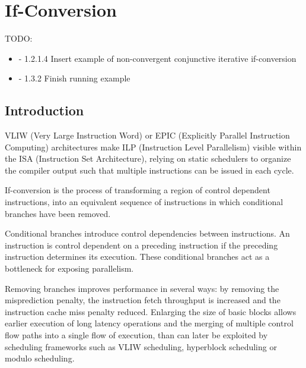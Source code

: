 \chapter{If-Conversion }\label{chap:if_conversion}
\label{chap:if_conv}
\graphicspath{{img/}{if_conversion/img/}{part4/if_conversion/img/}}

\newcommand\cond{~?~}
\newcommand{\annotation}[1]{%
  \marginpar{\small\itshape\color{red}#1}}


TODO:
\begin{itemize}
\item  - 1.2.1.4 Insert example of non-convergent conjunctive iterative if-conversion
\item  - 1.3.2   Finish running example 
 \end{itemize}

\section{Introduction}

VLIW (Very Large Instruction Word) or EPIC (Explicitly Parallel Instruction Computing) architectures make ILP (Instruction Level Parallelism) visible within the ISA (Instruction Set Architecture), relying on static schedulers to organize the compiler output such that multiple instructions can be issued in each cycle.

If-conversion is the process of transforming a region of control dependent instructions, into an equivalent sequence of instructions in which conditional branches have been removed.

Conditional branches introduce control dependencies between instructions. An instruction is control dependent on a preceding instruction if the preceding instruction determines its execution. These conditional branches act as a bottleneck for exposing parallelism.

Removing branches improves performance in several ways: by removing the misprediction penalty, the instruction fetch throughput is increased and the instruction cache miss penalty reduced. Enlarging the size of basic blocks allows earlier execution of long latency operations and the merging of multiple control flow paths into a single flow of execution, than can later be exploited by scheduling frameworks such as VLIW scheduling, hyperblock scheduling or modulo scheduling.

